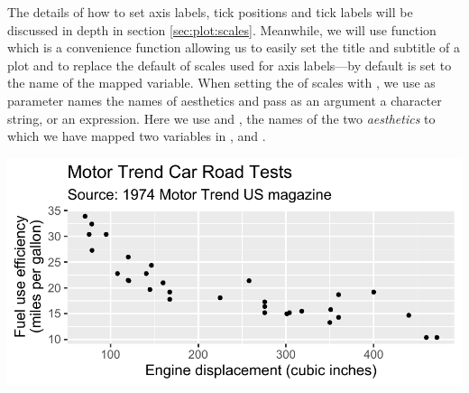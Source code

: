 \documentclass[krantz2]{krantz}\usepackage{knitr}
\begin{document}
The details of how to set axis labels, tick positions and tick labels will be discussed in depth in section \ref{sec:plot:scales}. Meanwhile, we will use function  which is a convenience function allowing us to easily set the title and subtitle of a plot and to replace the default  of scales used for axis labels---by default  is set to the name of the mapped variable. When setting the  of scales with , we use as parameter names the names of aesthetics and pass as an argument a character string, or an \Rlang expression. Here we use  and , the names of the two \emph{aesthetics} to which we have mapped two variables in ,  and .

\begin{knitrout}\footnotesize
{}\color{fgcolor}\begin{kframe}
\begin{alltt}
\hlstd{(} 
       \hlstd{(}    \hlopt{+}
  \hlstd{()} \hlopt{+}
  \hlstd{(} \hlstd{=} \hlstd{,}
        \hlstd{=} \hlstd{,}
        \hlstd{=} \hlstd{,}
        \hlstd{=} \hlstd{)}
\end{alltt}
\end{kframe}

{\centering \includegraphics[width=.7\textwidth]{figure/pos-ggplot-basics-11-1} 

}



\end{knitrout}
\end{document}
